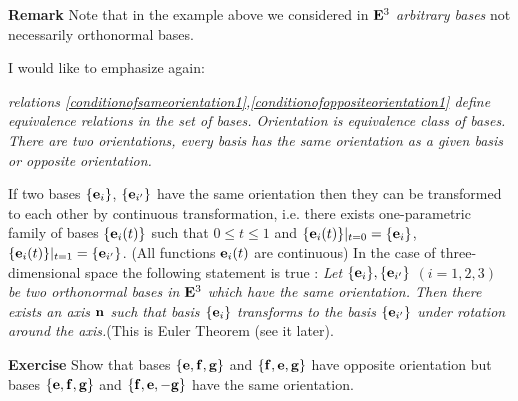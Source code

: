 \documentclass[12pt]{article}
\numberwithin{equation}{section}
\begin{document}
{\bf Remark} Note that in the example above we considered in ${\bf E}^3$
{\it arbitrary bases} not necessarily orthonormal bases.





\m



I would like to emphasize again:

{\it relations \eqref{conditionofsameorientation1},\eqref{conditionofoppositeorientation1}
 define equivalence relations in the set of bases.
 Orientation is equivalence class of bases.
There are two orientations, every basis has the same orientation as a given basis
or opposite orientation.}


\bigskip

{\small If two bases $\{{\bf e}_i\}$, $\{{\bf e}_{i'}\}$ have the same
orientation then they can be transformed to each other by continuous
transformation, i.e. there exists one-parametric family of
bases $\{{\bf e}_i(t)\}$ such that $0\leq t\leq 1$
and $\{{\bf e}_i(t)\}\vert_{t=0}=\{{\bf e}_i\}$, $\{{\bf e}_i(t)\}\vert_{t=1}=\{{\bf e}_{i'}\}$. (All functions ${\bf e}_i(t)$ are continuous)
In the case of three-dimensional space the following statement is
true :
{\it Let  $\{{\bf e}_{i}\},\{{\bf e}_{i'}\}$ $(i=1,2,3)$
be two orthonormal bases in ${\bf E}^3$ which have the same orientation. Then there
exists an axis ${\bf n}$ such that basis $\{{\bf e}_{i}\}$ transforms to the basis $\{{\bf e}_{i'}\}$
under rotation around the axis.}(This is Euler Theorem (see it later).}

\m

{\bf Exercise} Show that bases $\{{\bf e},{\bf f},{\bf g}\}$ and  $\{{\bf f},{\bf e},{\bf g}\}$
have opposite orientation but bases $\{{\bf e},{\bf f},{\bf g}\}$ and  $\{{\bf f},{\bf e},-{\bf g}\}$
have the same orientation.


\m
\end{document}
